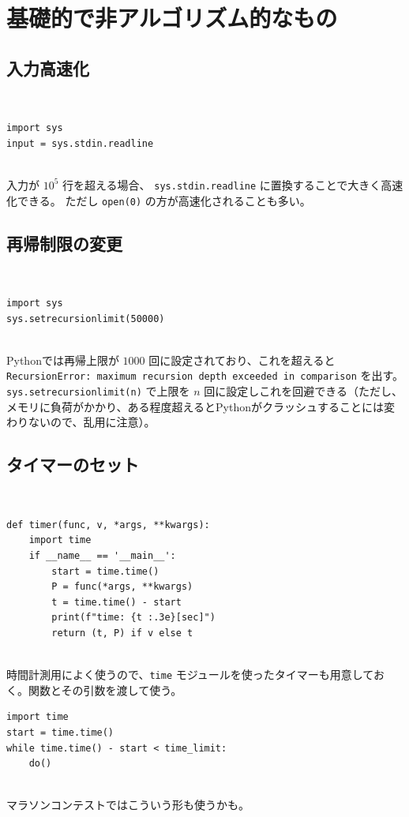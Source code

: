 \documentclass[12pt, a4j]{ltjsarticle}
\begin{document}
\newpage
\section{基礎的で非アルゴリズム的なもの}
\subsection{入力高速化}
\\
\begin{lstlisting}
import sys
input = sys.stdin.readline
\end{lstlisting}
\quad\\
入力が $10^5$ 行を超える場合、 \lstinline{sys.stdin.readline} に置換することで大きく高速化できる。
ただし \lstinline{open(0)} の方が高速化されることも多い。
\quad\\

\subsection{再帰制限の変更}
\\
\begin{lstlisting}
import sys
sys.setrecursionlimit(50000)
\end{lstlisting}
\quad\\
Pythonでは再帰上限が $1000$ 回に設定されており、これを超えると \lstinline{RecursionError: maximum recursion depth exceeded in comparison} を出す。
\lstinline{sys.setrecursionlimit(n)} で上限を $n$ 回に設定しこれを回避できる（ただし、メモリに負荷がかかり、ある程度超えるとPythonがクラッシュすることには変わりないので、乱用に注意）。
\newpage

\subsection{タイマーのセット}
\\
\begin{lstlisting}
def timer(func, v, *args, **kwargs):
    import time
    if __name__ == '__main__':
        start = time.time()
        P = func(*args, **kwargs)
        t = time.time() - start
        print(f"time: {t :.3e}[sec]")
        return (t, P) if v else t
\end{lstlisting}
\quad\\
時間計測用によく使うので、\lstinline{time} モジュールを使ったタイマーも用意しておく。関数とその引数を渡して使う。
\\
\begin{lstlisting}
import time
start = time.time()
while time.time() - start < time_limit:
    do()
\end{lstlisting}
\quad\\
マラソンコンテストではこういう形も使うかも。
\end{document}
